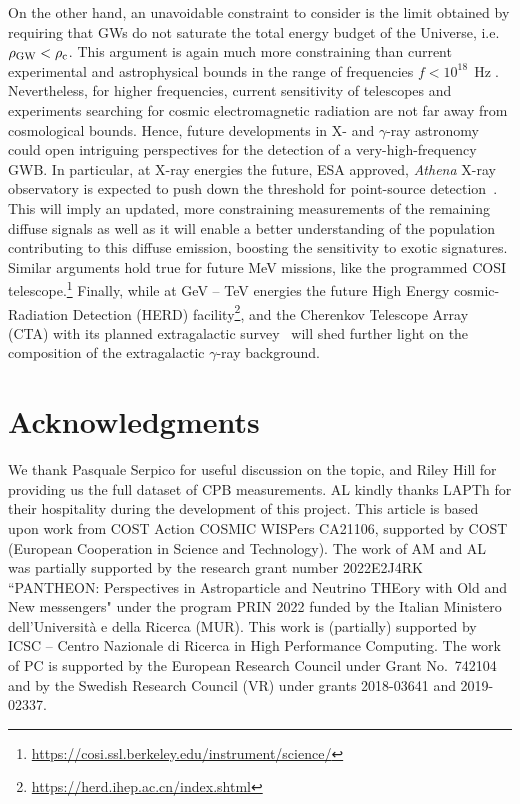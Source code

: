 \documentclass[twocolumn,superscriptaddress,floatfix,preprintnumbers, nofootinbib,hyperref]{revtex4-2}
\DeclareMathOperator{\Hz}{Hz}
\begin{document}
On the other hand, an unavoidable constraint to consider is the limit obtained by requiring that GWs do not saturate the total energy budget of the Universe, i.e. $\rho_{\rm GW}<\rho_{\rm c}$. This argument is again much more constraining than current experimental and astrophysical bounds in the range of frequencies $f<10^{18}\,\Hz$. Nevertheless, for higher frequencies, current sensitivity of telescopes and experiments searching for cosmic electromagnetic radiation are not far away from cosmological bounds. Hence, future developments in X- and $\gamma$-ray astronomy could open intriguing perspectives for the detection of a very-high-frequency GWB. 
In particular, at X-ray energies the future, ESA approved, {\it Athena} X-ray observatory is expected to push down the 
threshold for point-source detection~\cite{Cucchetti:2018izp}. This will imply an updated, more constraining measurements of the remaining 
diffuse signals as well as it will enable a better understanding of the population
contributing to this diffuse emission, boosting the sensitivity to exotic signatures. 
%
Similar arguments hold true for future MeV missions, like the programmed COSI telescope.\footnote{\url{https://cosi.ssl.berkeley.edu/instrument/science/}}
Finally, while at GeV -- TeV energies the future High Energy cosmic-Radiation Detection (HERD) facility\footnote{\url{https://herd.ihep.ac.cn/index.shtml}}, and the Cherenkov Telescope  Array (CTA) with its planned extragalactic 
survey~\cite{CTAConsortium:2017dvg} will shed further light on the composition of the extragalactic $\gamma$-ray background.



\section*{Acknowledgments}
We thank Pasquale Serpico for useful discussion on the topic, and Riley Hill for providing us the full dataset of CPB measurements. AL kindly thanks LAPTh for their hospitality during the development of this project. This article is based upon work from COST Action COSMIC WISPers CA21106, supported by COST (European Cooperation in Science and Technology).
The work of AM and AL was partially supported by the research grant number 2022E2J4RK ``PANTHEON: Perspectives in Astroparticle and
Neutrino THEory with Old and New messengers" under the program PRIN 2022 funded by the Italian Ministero dell’Universit\`a e della Ricerca (MUR). 
This work is (partially) supported
by ICSC – Centro Nazionale di Ricerca in High Performance Computing.
The work of PC is supported by the European Research Council under Grant No.~742104 and by the Swedish Research Council (VR) under grants  2018-03641 and 2019-02337.





\end{document}
